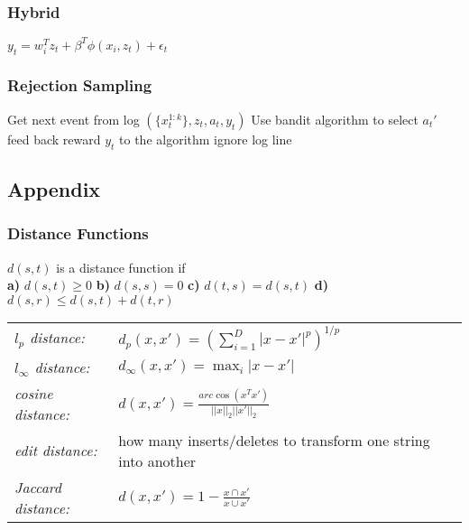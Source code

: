 \documentclass[7pt,parskip]{scrartcl}
\begin{document}
\begin{multicols*}{3}
\subsubsection{Hybrid} %
\label{ssub:hybrid}
$y_t = w_i^T z_t + \beta^T \phi(x_i,z_t) + \epsilon_t$

\subsubsection{Rejection Sampling} %
\label{ssub:rejection_sampling}
\begin{algorithmic}
		\State Get next event from log $(\{x_t^{1:k}\},z_t,a_t,y_t)$
		\State Use bandit algorithm to select $a_t'$
			\State feed back reward $y_t$ to the algorithm
		\Else
			\State ignore log line
		\EndIf
	\EndFor
\end{algorithmic}

\subsection{Appendix}
\subsubsection{Distance Functions} %
\label{ssub:distance_functions}
$d(s,t)$ is a distance function if \\
\textbf{a)} $d(s,t) \geq 0$ \textbf{b)} $d(s,s) = 0$ 
\textbf{c)} $d(t,s) = d(s,t)$ \textbf{d)} $d(s,r) \leq d(s,t) + d(t,r)$\\
	\begin{tabular} {l p{6cm}}
		\emph{$l_p$ distance:} & $d_p(x,x') = (\sum_{i=1}^D |x-x'|^p)^{1/p}$ \\
		\emph{$l_\infty$ distance:} & $d_\infty(x,x') = \max_i |x-x'|$ \\
		\emph{cosine distance:} & $d(x,x') = \frac{arc\cos(x^T x')}{||x||_2||x'||_2}$ \\
		\emph{edit distance:} & how many inserts/deletes to transform one string into another \\
		\emph{Jaccard distance: } & $d(x,x') =  1- \frac{x \cap x'}{x \cup x'}$ 
	\end{tabular}


\end{multicols*}
\end{document}
